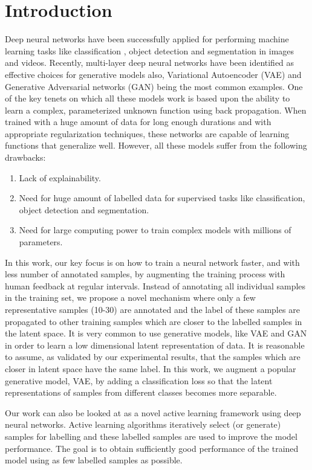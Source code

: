 \documentclass[runningheads]{llncs}
\begin{document}
\section{Introduction}
Deep neural networks have been successfully applied  for performing machine learning tasks like classification \cite{alexnet,vggnet,resnet}, object detection \cite{faster_rcnn,yolo} and segmentation \cite{deeplab,unet} in images and videos.
Recently, multi-layer deep neural networks have been identified as  effective  choices for  generative models also, Variational Autoencoder (VAE) \cite{vae} and Generative Adversarial networks (GAN) \cite{gan} being the most common examples.
One of the key tenets on which all these models work is  based upon the ability to learn a complex, parameterized unknown function using back propagation.
When trained with a huge amount of data for long enough durations and with appropriate regularization techniques, these networks are capable of learning functions that generalize well.
However, all these  models suffer from the following drawbacks:
\begin{enumerate}
  \item Lack of explainability.
  \item Need for huge amount of labelled data for supervised tasks like classification, object detection and segmentation.
  \item Need for large computing power to train complex models with millions of parameters.
\end{enumerate}

In this work, our key focus is on how to train a neural network faster, and with less number of annotated samples, by augmenting the training process with human feedback at regular intervals.
Instead of annotating all individual samples in the training set, we propose a novel mechanism where only a few representative samples (10-30) are annotated and the label of these samples are propagated to other training samples  which are closer to the labelled samples in the latent space.
It is very common to use  generative models, like VAE \cite{vae} and GAN\cite{gan} in order to learn a low dimensional latent representation of data.
It is reasonable to assume, as validated by our experimental results, that the samples which are closer in latent space have the same label.
In this work, we augment a popular generative model, VAE,  by adding a classification loss so that the latent representations of samples from different classes becomes more separable.

Our work can also be looked at  as a novel  active learning framework using deep neural networks.
Active learning algorithms iteratively select (or generate) samples for labelling and these labelled samples are used to improve the model performance.
The goal is to obtain sufficiently good performance of the trained model using as few labelled samples as possible.
\end{document}
